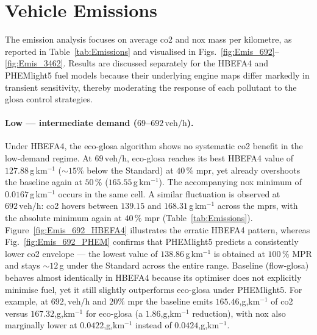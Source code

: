 \section{Vehicle Emissions}
\label{sec:Results_Emissions}

The emission analysis focuses on average \ac{co2} and \ac{nox} mass per kilometre, as reported in Table~\ref{tab:Emissions} and visualised in Figs.~\ref{fig:Emis_692}--\ref{fig:Emis_3462}. Results are discussed separately for the HBEFA4 and PHEMlight5 fuel models because their underlying engine maps differ markedly in transient sensitivity, thereby moderating the response of each pollutant to the \ac{glosa} control strategies.

\paragraph{Low --- intermediate demand ($69$--$692\,\mathrm{veh/h}$).}
Under HBEFA4, the \ac{eco-glosa} algorithm shows no systematic \ac{co2} benefit in the low‐demand regime. At $69\,\mathrm{veh/h}$, \ac{eco-glosa} reaches its best HBEFA4 value of $127.88$\,g\,km$^{-1}$ (${\sim}15\%$ below the Standard) at $40\,\%$ \ac{mpr}, yet already overshoots the baseline again at $50\,\%$ ($165.55$\,g\,km$^{-1}$). The accompanying \ac{nox} minimum of $0.0167$\,g\,km$^{-1}$ occurs in the same cell. A similar fluctuation is observed at $692\,\mathrm{veh/h}$: \ac{co2} hovers between $139.15$ and $168.31$\,g\,km$^{-1}$ across the \acp{mpr}, with the absolute minimum again at $40\,\%$ \ac{mpr} (Table~\ref{tab:Emissions}). Figure~\ref{fig:Emis_692_HBEFA4} illustrates the erratic HBEFA4 pattern, whereas Fig.~\ref{fig:Emis_692_PHEM} confirms that PHEMlight5 predicts a consistently lower \ac{co2} envelope --- the lowest value of $138.86$\,g\,km$^{-1}$ is obtained at $100\,\%$ MPR and stays ${\sim}12$\,g under the Standard across the entire range.
\mynewline
Baseline (\ac{flow-glosa}) behaves almost identically in HBEFA4 because its optimiser does not explicitly minimise fuel, yet it still slightly outperforms \ac{eco-glosa} under PHEMlight5. For example, at $692,\mathrm{veh/h}$ and $20\%$ \ac{mpr} the baseline emits $165.46$,g,km$^{-1}$ of \ac{co2} versus $167.32$,g,km$^{-1}$ for \ac{eco-glosa} (a $1.86$,g,km$^{-1}$ reduction), with \ac{nox} also marginally lower at $0.0422$,g,km$^{-1}$ instead of $0.0424$,g,km$^{-1}$.

